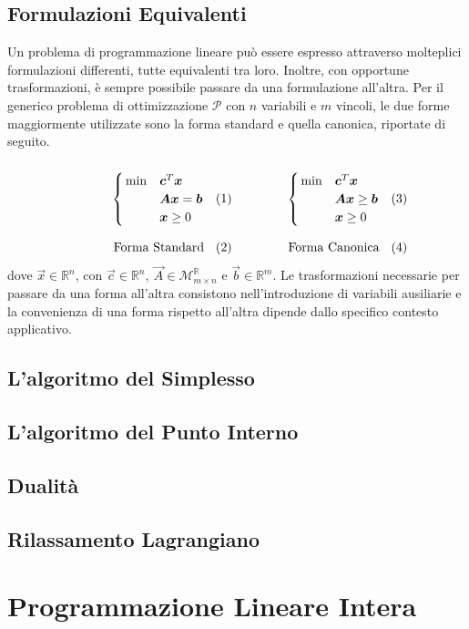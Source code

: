 \subsection{Formulazioni Equivalenti}
Un problema di programmazione lineare può essere espresso attraverso
molteplici formulazioni differenti, tutte equivalenti tra loro. Inoltre,
con opportune trasformazioni, è sempre possibile passare da una
formulazione all'altra. Per il generico problema di ottimizzazione
$\mathcal{P}$ con $n$ variabili e $m$ vincoli, le due forme maggiormente
utilizzate sono la forma standard e quella canonica, riportate di seguito.
\\
\begin{subequations}
\hspace*{.08\textwidth}
\begin{minipage}{.3\textwidth}
\begin{align}\notag
    \begin{cases}
        \,\min & \vec{c}^T \vec{x} \\
             & \vec{A} \vec{x} = \vec{b} \\
             & \vec{x} \ge 0
    \end{cases}\\[7pt] \text{Forma Standard}
\end{align}
\end{minipage}\hspace{.1\textwidth}
\begin{minipage}{.3\textwidth}
    \begin{align}\notag
    \begin{cases}
        \,\min & \vec{c}^T \vec{x} \\
             & \vec{A} \vec{x} \ge \vec{b} \\
             & \vec{x} \ge 0
    \end{cases}\\[7pt] \text{Forma Canonica}
\end{align}
\end{minipage}\\[10pt]
\end{subequations}
dove $\vec{x} \in \mathbb{R}^n$, con $\vec{c} \in \mathbb{R}^n,\ \vec{A}
\in \mathcal{M}_{m \times n}^{\mathbb{R}}$ e $\vec{b} \in \mathbb{R}^m$.
Le trasformazioni necessarie per passare da una forma all'altra consistono
nell'introduzione di variabili ausiliarie e la convenienza di una forma
rispetto all'altra dipende dallo specifico contesto applicativo.

\subsection{L'algoritmo del Simplesso}
\subsection{L'algoritmo del Punto Interno}
\subsection{Dualità}
\subsection{Rilassamento Lagrangiano}

\section{Programmazione Lineare Intera}

